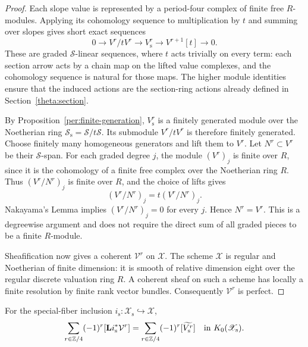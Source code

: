 \begin{proof}
Each slope value is represented by a period-four complex of finite free
$R$-modules.  Applying its cohomology sequence to multiplication by $t$
and summing over slopes gives short exact sequences
\begin{equation}
 0\longrightarrow V^r/tV^r\longrightarrow V_{\mathrm s}^r
  \longrightarrow V^{r+1}[t]\longrightarrow0.
 \label{lift:cohomology-sequence}
\end{equation}
These are graded $\mathscr S$-linear sequences, where $t$ acts trivially
on every term: each section arrow acts by a chain map on the lifted
value complexes, and the cohomology sequence is natural for those maps.
The higher module identities ensure that the induced actions are the
section-ring actions already defined in Section~\ref{theta:section}.

By Proposition~\ref{per:finite-generation}, $V_{\mathrm s}^r$ is a
finitely generated module over the Noetherian ring
$\mathscr S_{\mathrm s}=\mathscr S/t\mathscr S$.
Its submodule $V^r/tV^r$ is therefore finitely generated.  Choose finitely
many homogeneous generators and lift them to $V^r$.  Let $N^r\subset V^r$
be their $\mathscr S$-span.  For each graded degree $j$, the module
$(V^r)_j$ is finite over $R$, since it is the cohomology of a finite
free complex over the Noetherian ring $R$.  Thus $(V^r/N^r)_j$ is finite
over $R$, and the choice of lifts gives
\[
 (V^r/N^r)_j=t(V^r/N^r)_j.
\]
Nakayama's Lemma implies $(V^r/N^r)_j=0$ for every $j$.  Hence $N^r=V^r$.
This is a degreewise argument and does not require the direct sum of all
graded pieces to be a finite $R$-module.

Sheafification now gives a coherent $\mathcal V^r$ on $\mathscr X$.
The scheme $\mathscr X$ is regular and Noetherian of finite dimension:
it is smooth of relative dimension eight over the regular discrete
valuation ring $R$.  A coherent sheaf on such a scheme has locally a
finite resolution by finite rank vector bundles.  Consequently
$\mathcal V^r$ is perfect.
\end{proof}

\begin{proposition}
\label{lift:cancellation}
For the special-fiber inclusion $i_{\mathrm s}:\mathscr X_{\mathrm s}
\hookrightarrow\mathscr X$,
\begin{equation}
 \sum_{r\in\mathbb Z/4}(-1)^r
       [\mathbf L i_{\mathrm s}^*\mathcal V^r]
 =\sum_{r\in\mathbb Z/4}(-1)^r[\widetilde{V_{\mathrm s}^r}]
 \quad\text{in }K_0(\mathscr X_{\mathrm s}).
 \label{lift:derived-equality}
\end{equation}
\end{proposition}

